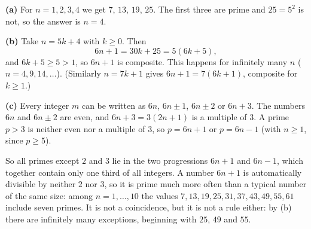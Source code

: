 \textbf{(a)} For $n=1,2,3,4$ we get $7$, $13$, $19$, $25$. The first three are prime and $25=5^2$ is not, so the answer is $n=\boxed{4}$.

\textbf{(b)} Take $n=5k+4$ with $k\ge0$. Then
\[6n+1=30k+25=5(6k+5),\]
and $6k+5\ge5>1$, so $6n+1$ is composite. This happens for infinitely many $n$ ($n=4,9,14,\dots$). (Similarly $n=7k+1$ gives $6n+1=7(6k+1)$, composite for $k\ge1$.)

\textbf{(c)} Every integer $m$ can be written as $6n$, $6n\pm1$, $6n\pm2$ or $6n+3$. The numbers $6n$ and $6n\pm2$ are even, and $6n+3=3(2n+1)$ is a multiple of $3$. A prime $p>3$ is neither even nor a multiple of $3$, so $p=6n+1$ or $p=6n-1$ (with $n\ge1$, since $p\ge5$).

So all primes except $2$ and $3$ lie in the two progressions $6n+1$ and $6n-1$, which together contain only one third of all integers. A number $6n+1$ is automatically divisible by neither $2$ nor $3$, so it is prime much more often than a typical number of the same size: among $n=1,\dots,10$ the values $7,13,19,25,31,37,43,49,55,61$ include seven primes. It is not a coincidence, but it is not a rule either: by (b) there are infinitely many exceptions, beginning with $25$, $49$ and $55$.
